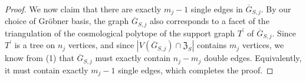 \documentclass[11pt]{article}
\theoremstyle{definition}
\numberwithin{equation}{section}
\begin{document}
\begin{proof}
We now claim that there are exactly $m_j - 1$ single edges in $\overline{G}_{S,j}$. 
By our choice of Gr\"obner basis, the graph $\overline{G}_{S,j}$ also corresponds to a facet of the triangulation of the cosmological polytope of the support graph $T^\prime$ of $\overline{G}_{S,j}$.  
Since $T^\prime$ is a tree on $n_j$ vertices, and since $|V(\overline{G}_{S,j})\cap \mathfrak{Z}_S|$ contains $m_j$ vertices, we know from (1) that $\overline{G}_{S,j}$ must exactly contain $n_j - m_j$ double edges.
Equivalently, it must contain exactly $m_j-1$ single edges, which completes the proof. 
% 
% 
% 
% 

\end{proof}
\end{document}
